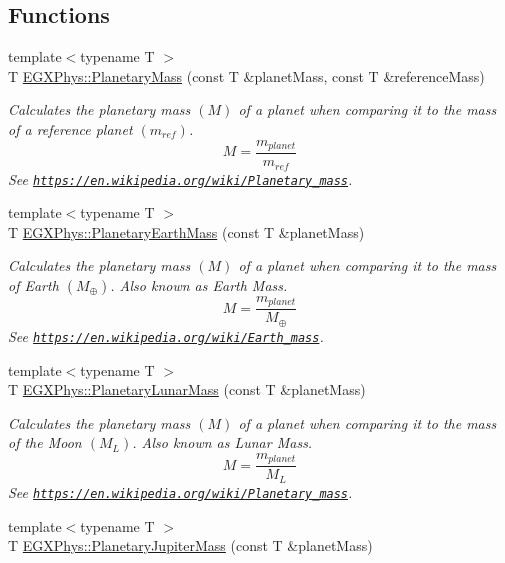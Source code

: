 \subsection*{Functions}
\begin{DoxyCompactItemize}
\item 
{\footnotesize template$<$typename T $>$ }\\T \mbox{\hyperlink{group___e_g_x_phys-_planetary_mass_ga225bcf56fb37468f6d4d46493d403503}{E\+G\+X\+Phys\+::\+Planetary\+Mass}} (const T \&planet\+Mass, const T \&reference\+Mass)
\begin{DoxyCompactList}\small\item\em Calculates the planetary mass $(M)$ of a planet when comparing it to the mass of a reference planet $(m_{ref})$. \[M=\frac{m_{planet}}{m_{ref}}\] See \href{https://en.wikipedia.org/wiki/Planetary_mass}{\tt https\+://en.\+wikipedia.\+org/wiki/\+Planetary\+\_\+mass}. \end{DoxyCompactList}\item 
{\footnotesize template$<$typename T $>$ }\\T \mbox{\hyperlink{group___e_g_x_phys-_planetary_mass_ga3d918c2d37a72b42b49aa6c3da08f450}{E\+G\+X\+Phys\+::\+Planetary\+Earth\+Mass}} (const T \&planet\+Mass)
\begin{DoxyCompactList}\small\item\em Calculates the planetary mass $(M)$ of a planet when comparing it to the mass of Earth $(M_\oplus)$. Also known as Earth Mass. \[M=\frac{m_{planet}}{M_\oplus}\] See \href{https://en.wikipedia.org/wiki/Earth_mass}{\tt https\+://en.\+wikipedia.\+org/wiki/\+Earth\+\_\+mass}. \end{DoxyCompactList}\item 
{\footnotesize template$<$typename T $>$ }\\T \mbox{\hyperlink{group___e_g_x_phys-_planetary_mass_gaaea9675ef409d141d269d970f2f5e9dd}{E\+G\+X\+Phys\+::\+Planetary\+Lunar\+Mass}} (const T \&planet\+Mass)
\begin{DoxyCompactList}\small\item\em Calculates the planetary mass $(M)$ of a planet when comparing it to the mass of the Moon $(M_L)$. Also known as Lunar Mass. \[M=\frac{m_{planet}}{M_L}\] See \href{https://en.wikipedia.org/wiki/Planetary_mass}{\tt https\+://en.\+wikipedia.\+org/wiki/\+Planetary\+\_\+mass}. \end{DoxyCompactList}\item 
{\footnotesize template$<$typename T $>$ }\\T \mbox{\hyperlink{group___e_g_x_phys-_planetary_mass_gaadff5ffa04bb55a572c1403ab9500c06}{E\+G\+X\+Phys\+::\+Planetary\+Jupiter\+Mass}} (const T \&planet\+Mass)

\end{DoxyCompactItemize}
